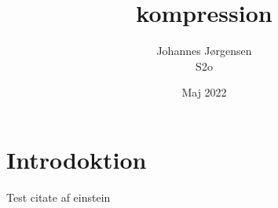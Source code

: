 \documentclass[12pt]{article}
\begin{document}
\title{kompression}
\author{Johannes Jørgensen\\ S2o}
\date{Maj 2022}
\maketitle
\pagebreak
\tableofcontents
\pagebreak

\section{Introdoktion}
Test citate af einstein\cite{filecatalyst/movesizes}\cite{Solarwinds/filesizes}\cite{Wiki/dataCompression}
\printbibliography[title={Litteraturliste}]
\end{document}

